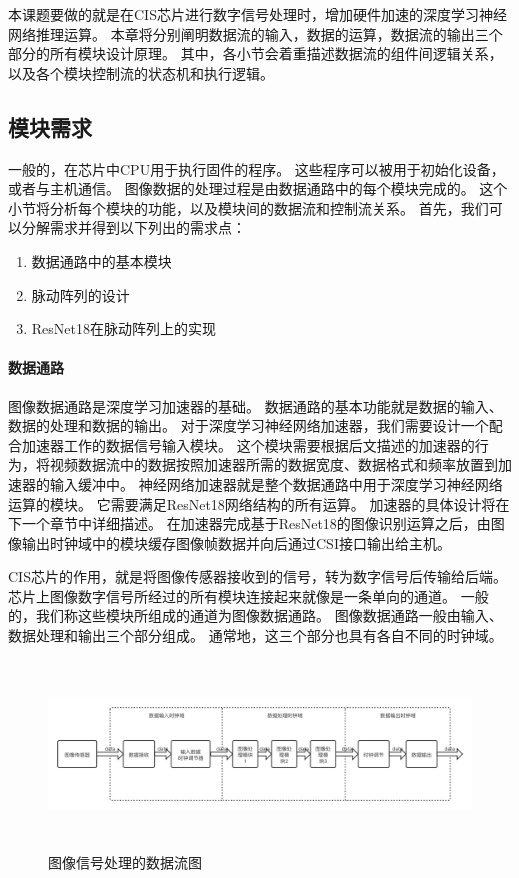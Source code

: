 本课题要做的就是在CIS芯片进行数字信号处理时，增加硬件加速的深度学习神经网络推理运算。
本章将分别阐明数据流的输入，数据的运算，数据流的输出三个部分的所有模块设计原理。
其中，各小节会着重描述数据流的组件间逻辑关系，以及各个模块控制流的状态机和执行逻辑。

\subsection{模块需求}

一般的，在芯片中CPU用于执行固件的程序。
这些程序可以被用于初始化设备，或者与主机通信。
图像数据的处理过程是由数据通路中的每个模块完成的。
这个小节将分析每个模块的功能，以及模块间的数据流和控制流关系。
首先，我们可以分解需求并得到以下列出的需求点：
\begin{enumerate}
    \item 数据通路中的基本模块
    \item 脉动阵列的设计
    \item ResNet18在脉动阵列上的实现
\end{enumerate}    

\paragraph{数据通路}
图像数据通路是深度学习加速器的基础。
数据通路的基本功能就是数据的输入、数据的处理和数据的输出。
对于深度学习神经网络加速器，我们需要设计一个配合加速器工作的数据信号输入模块。
这个模块需要根据后文描述的加速器的行为，将视频数据流中的数据按照加速器所需的数据宽度、数据格式和频率放置到加速器的输入缓冲中。
神经网络加速器就是整个数据通路中用于深度学习神经网络运算的模块。
它需要满足ResNet18网络结构的所有运算。
加速器的具体设计将在下一个章节中详细描述。
在加速器完成基于ResNet18的图像识别运算之后，由图像输出时钟域中的模块缓存图像帧数据并向后通过CSI接口输出给主机。


CIS芯片的作用，就是将图像传感器接收到的信号，转为数字信号后传输给后端。
芯片上图像数字信号所经过的所有模块连接起来就像是一条单向的通道。
一般的，我们称这些模块所组成的通道为图像数据通路。
图像数据通路一般由输入、数据处理和输出三个部分组成。
通常地，这三个部分也具有各自不同的时钟域。

\begin{figure}[htbp]
    \centering
    \includegraphics[width=15cm,height=5cm]{figures/datapath.png}
    \caption{图像信号处理的数据流图}
    \label{fig:datapath}
\end{figure}

